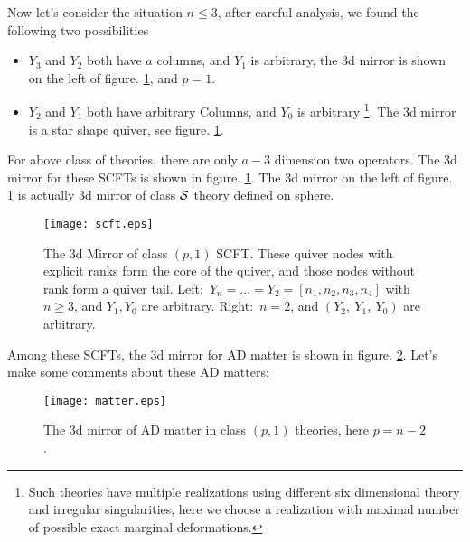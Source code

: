 \documentclass[a4paper,11pt]{article}
\begin{document}
Now let's consider the situation $n\leq 3$, after careful analysis, we found the following two possibilities 
\begin{itemize}
\item $Y_3$ and $Y_2$ both have $a$ columns, and $Y_1$ is arbitrary, the 3d mirror is shown on the left of figure. \ref{scft}, and $p=1$.
\item   $Y_2$ and $Y_1$ both have arbitrary Columns, and $Y_0$ is arbitrary \footnote{Such theories have multiple realizations using different six dimensional theory and irregular singularities, here we choose 
a realization with maximal number of possible exact marginal deformations.}. The 3d mirror is a star shape quiver, see figure. \ref{scft}. 
\end{itemize}
For above class of theories, there are only $a-3$ dimension two operators. 
The 3d mirror for these SCFTs is shown in figure. \ref{scft}. The 3d mirror on the left of figure. \ref{scft} is actually 3d mirror of class ${\cal S}$ theory defined on sphere. 

\begin{figure}[h]
\centering
  \texttt{[image: scft.eps]}
  \caption{The 3d Mirror of class $(p,1)$ SCFT. These quiver nodes with explicit ranks form the core of the quiver, and those nodes without rank form a quiver tail. 
   Left:~$Y_n=\ldots=Y_2=[n_1,n_2, n_3, n_4]$ with $n\geq 3$,  and $Y_1,Y_0$ are arbitrary. Right:~$n=2$, and $(Y_2,~Y_1,~Y_0)$ are arbitrary. }
  \label{scft}
\end{figure}


Among these SCFTs, the 3d mirror for AD matter  is shown in figure. \ref{poneAD}.
Let's make some comments about these AD matters:
\begin{figure}[h]
\centering
  \texttt{[image: matter.eps]}
  \caption{The 3d mirror of AD matter in class $(p,1)$ theories, here $p=n-2$.}
  \label{poneAD}
\end{figure}
\end{document}
